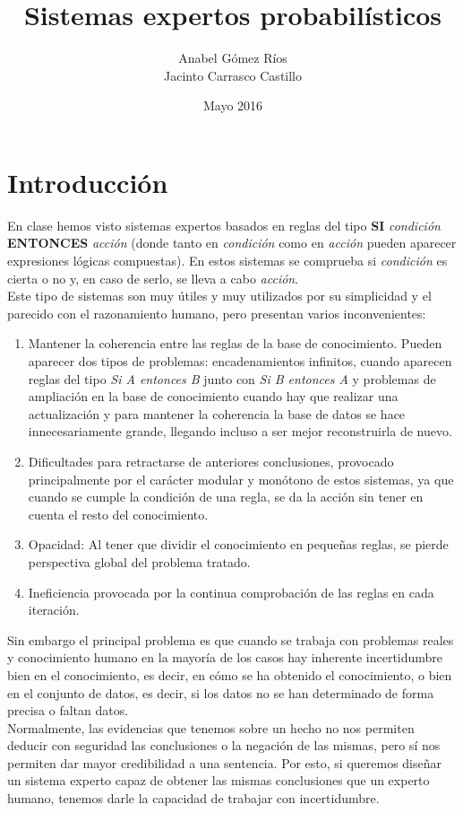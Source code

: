 \documentclass{article}
\title{Sistemas expertos probabilísticos}
\author{Anabel Gómez Ríos\\
        Jacinto Carrasco Castillo}
\date{Mayo 2016}
\begin{document}
\maketitle

\section{Introducción}
En clase hemos visto sistemas expertos basados en reglas del tipo \textbf{SI} \textit{condición} \textbf{ENTONCES} \textit{acción} (donde tanto en \textit{condición} como en \textit{acción} pueden aparecer expresiones lógicas compuestas). En estos sistemas se comprueba si \textit{condición} es cierta o no y, en caso de serlo, se lleva a cabo \textit{acción}.\\

Este tipo de sistemas son muy útiles y muy utilizados por su simplicidad y el parecido con el razonamiento humano, pero presentan varios inconvenientes:
\begin{enumerate}
    \item Mantener la coherencia entre las reglas de la base de conocimiento. Pueden aparecer dos tipos de problemas: encadenamientos infinitos, cuando aparecen reglas del tipo \textit{Si A entonces B} junto con \textit{Si B entonces A} y problemas de ampliación en la base de conocimiento cuando hay que realizar una actualización y para mantener la coherencia la base de datos se hace innecesariamente grande, llegando incluso a ser mejor reconstruirla de nuevo.
    \item Dificultades para retractarse de anteriores conclusiones, provocado principalmente por el carácter modular y monótono de estos sistemas, ya que cuando se cumple la condición de una regla, se da la acción sin tener en cuenta el resto del conocimiento. 
    \item Opacidad: Al tener que dividir el conocimiento en pequeñas reglas, se pierde perspectiva global del problema tratado.
    \item Ineficiencia provocada por la continua comprobación de las reglas en cada iteración.
\end{enumerate}

Sin embargo el principal problema es que cuando se trabaja con problemas reales y conocimiento humano en la mayoría de los casos hay inherente incertidumbre bien en el conocimiento, es decir, en cómo se ha obtenido el conocimiento, o bien en el conjunto de datos, es decir, si los datos no se han determinado de forma precisa o faltan datos.\\
Normalmente, las evidencias que tenemos sobre un hecho no nos permiten deducir con seguridad las conclusiones o la negación de las mismas, pero sí nos permiten dar mayor credibilidad a una sentencia. Por esto, si queremos diseñar un sistema experto capaz de obtener las mismas conclusiones que un experto humano, tenemos darle la capacidad de trabajar con incertidumbre.
\end{document}
